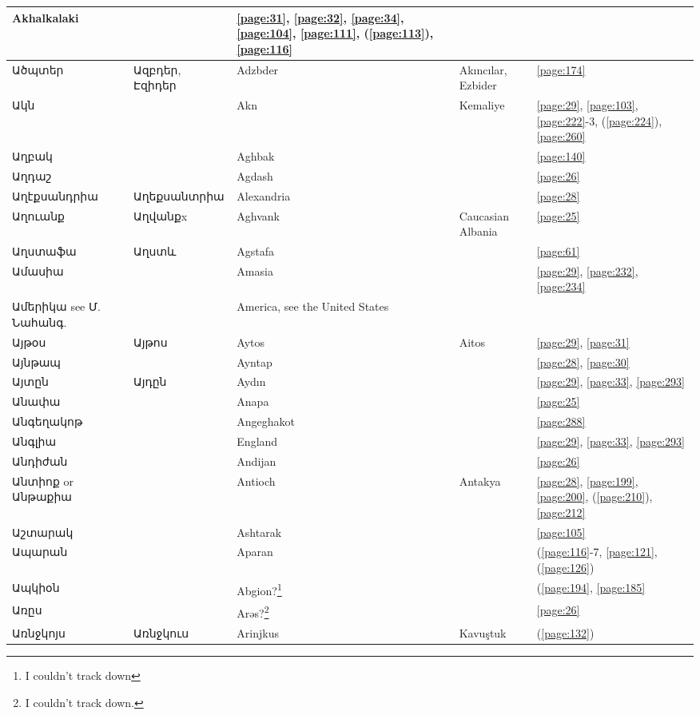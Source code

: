 \begin{center}
\begin{longtable}{|p{}|p{3cm}|p{3cm}|p{2cm}|p{3cm}|}
{Akhalkalaki}& &\ref{page:31}, \ref{page:32}, \ref{page:34}, \ref{page:104}, \ref{page:111}, (\ref{page:113}), \ref{page:116}\\ \hline
Ածպտեր& Ազբդեր, Էզիդեր& 
{Adzbder} &Akıncılar, Ezbider &\ref{page:174}\\ \hline
Ակն& &
{Akn}&Kemaliye &\ref{page:29}, \ref{page:103}, \ref{page:222}-3, (\ref{page:224}), \ref{page:260}\\ \hline
Աղբակ& & 
{Aghbak}& &\ref{page:140}\\ \hline
Աղդաշ& & 
{Agdash}& &\ref{page:26}\\ \hline
Աղէքսանդրիա& Աղեքսանտրիա
&{Alexandria}& &\ref{page:28}\\ \hline
Աղուանք& Աղվանքx
& {Aghvank}&Caucasian Albania &\ref{page:25}\\ \hline
Աղստաֆա& Աղստև
& {Agstafa}& &\ref{page:61}\\ \hline
Ամասիա& & 
{Amasia}& &\ref{page:29}, \ref{page:232}, \ref{page:234}\\ \hline
Ամերիկա see Մ. Նահանգ.& &America, see the United States & &\\ \hline
Այթօս&Այթոս & 
{Aytos}& Aitos&\ref{page:29}, \ref{page:31}\\ \hline
Այնթապ& &
Ayntap& &\ref{page:28}, \ref{page:30}\\ \hline
Այտըն& Այդըն 
&{Aydın} & &\ref{page:29}, \ref{page:33}, \ref{page:293}\\ \hline
Անափա & &Anapa & & \ref{page:25} \\\hline 
Անգեղակոթ &   &Angeghakot & & \ref{page:288} \\ \hline 
Անգլիա & &England & & \ref{page:29}, \ref{page:33}, \ref{page:293} \\ \hline 
Անդիժան& & 
{Andijan}& &\ref{page:26}\\ \hline
Անտիոք or Անթաքիա& & 
Antioch& Antakya &\ref{page:28}, \ref{page:199}, \ref{page:200}, (\ref{page:210}), \ref{page:212}\\ \hline
Աշտարակ& & 
{Ashtarak}& &\ref{page:105}\\ \hline
Ապարան& & 
{Aparan}& &(\ref{page:116}-7, \ref{page:121}, (\ref{page:126})\\ \hline
Ապկիօն& &
{Abgion?}\footnote{I couldn't track down}& &(\ref{page:194}, \ref{page:185}\\ \hline
Առըս& & 
{Arəs?}\footnote{I couldn't track down.}&&\ref{page:26}\\ \hline
Առնջկոյս&Առնջկուս
& Arinjkus& Kavuştuk       &(\ref{page:132})\\ \hline

\end{longtable}
\end{center}
